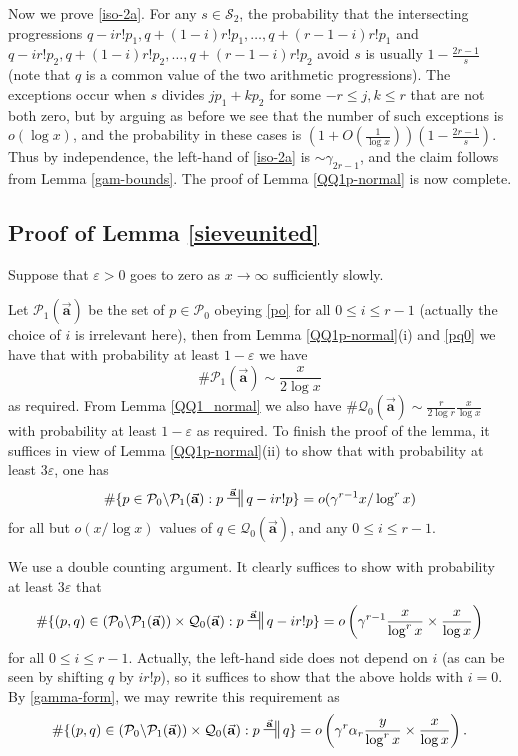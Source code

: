 \documentclass[12pt]{amsart}
\numberwithin{equation}{section}  %
\theoremstyle{remark}
\theoremstyle{plain}
\numberwithin{equation}{section}
\newcommand{\eps}{\ensuremath{\varepsilon}}
\renewcommand{\leq}{\leqslant}
\renewcommand{\(}{\left(}
\renewcommand{\)}{\right)}
\newcommand{\asym}{\sim}   %
\newcommand{\relra}{\nsdtstile{}{\vect{\mathbf{a}}}} %
\newcommand{\vect}[1]{{\ensuremath{\vec{#1}}}}
\newcommand{\PP}{\mathcal{P}}
\newcommand{\QQ}{\mathcal{Q}}
\newcommand{\cS}{\mathcal{S}}
\begin{document}
Now we prove \eqref{iso-2a}.  For any $s \in \cS_2$, the probability that the intersecting progressions $q-ir!p_1, q+(1-i)r!p_1,\dots, q+(r-1-i)r! p_1$ and $q-ir!p_2, q+(1-i)r!p_2,\dots, q+(r-1-i)r! p_2$ avoid $s$ is usually $1 - \frac{2r-1}{s}$ (note that $q$ is a common value of the two arithmetic progressions).  The exceptions occur when $s$ divides $jp_1+kp_2$ for some $-r \leq j,k \leq r$ that are not both zero, but by arguing as before we see that the number of such exceptions is $o(\log x)$, and the probability in these cases is $(1 + O(\frac{1}{\log x})) (1 - \frac{2r-1}{s})$.  Thus by independence, the left-hand of \eqref{iso-2a} is $\asym \gamma_{2r-1}$, and the claim follows from Lemma \ref{gam-bounds}.  The proof of Lemma \ref{QQ1p-normal} is now complete.

\subsection{Proof of Lemma \ref{sieveunited}}

Suppose that $\eps>0$ goes to zero as $x \to \infty$ sufficiently
slowly.

Let $\PP_1(\vect{\mathbf{a}})$ be the set of $p \in \PP_0$ obeying \eqref{po} for all $0 \leq i \leq r-1$ (actually the choice of $i$ is irrelevant here), then from Lemma \ref{QQ1p-normal}(i) and \eqref{pq0} we have that with probability at least $1-\eps$ we have
\begin{equation}\label{pp1}
 \# \PP_1(\vect{\mathbf{a}}) \asym \frac{x}{2\log x}
\end{equation}
as required.  From Lemma \ref{QQ1_normal} we also have $ \# \QQ_0(\vect{\mathbf{a}}) \asym \frac{r}{2\log r} \frac{x}{\log x}$ with probability at least $1-\eps$ as required.  To finish the proof of the lemma, it suffices in view of Lemma \ref{QQ1p-normal}(ii) to show that with probability at least $3\eps$, one has
$$ 
\#  \{ p \in \PP_0 \backslash \PP_1(\vect{\mathbf{a}}):  p \relra q - ir! p \} = o( \gamma^{r-1} x / \log^r x )$$
for all but $o(x/\log x)$ values of $q \in \QQ_0(\vect{\mathbf{a}})$, and any $0 \leq i \leq r-1$.  

We use a double counting argument.  It clearly suffices to show with probability at least $3\eps$ that
$$ 
\#  \{ (p,q) \in (\PP_0 \backslash \PP_1(\vect{\mathbf{a}})) \times \QQ_0(\vect{\mathbf{a}}):  p \relra q - ir! p \} = o\left( \gamma^{r-1} \frac{x}{\log^r x} \times \frac{x}{\log x} \right)
$$
for all $0 \leq i \leq r-1$.  Actually, the left-hand side does not
depend on $i$ (as can be seen by shifting $q$ by $ir! p$), so it
suffices to show that the above holds with $i=0$.
By \eqref{gamma-form}, we may rewrite this requirement as
$$ 
\#  \{ (p,q) \in (\PP_0 \backslash \PP_1(\vect{\mathbf{a}})) \times \QQ_0(\vect{\mathbf{a}}):  p \relra q \} = o\left( \gamma^r \alpha_r \frac{y}{\log^r x} \times \frac{x}{\log x} \right).
$$
\end{document}
